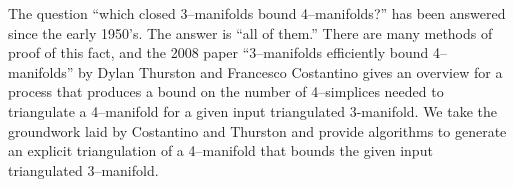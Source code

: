 The question ``which closed 3--manifolds bound 4--manifolds?'' has been answered since the early 1950's.
The answer is ``all of them.''
There are many methods of proof of this fact, and the 2008 paper ``3--manifolds efficiently bound 4--manifolds'' by Dylan Thurston and Francesco Costantino gives an overview for a process that produces a bound on the number of 4--simplices needed to triangulate a 4--manifold for a given input triangulated 3-manifold.
We take the groundwork laid by Costantino and Thurston and provide algorithms to generate an explicit triangulation of a 4--manifold that bounds the given input triangulated 3--manifold.